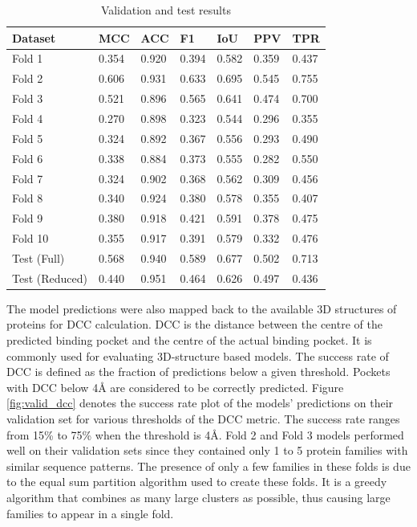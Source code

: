 \documentclass[journal=jcisd8,manuscript=article]{achemso}
\begin{document}
\begin{table}
    \centering
    \begin{tabular}{| P{2.9cm} | P{1.75cm} | P{1.75cm} | P{1.75cm} | P{1.75cm} | P{1.75cm} | P{1.75cm} |}
        \hline
        Dataset        & MCC   & ACC   & F1    & IoU   & PPV   & TPR   \\
        \hline
        Fold 1         & 0.354 & 0.920 & 0.394 & 0.582 & 0.359 & 0.437 \\
        Fold 2         & 0.606 & 0.931 & 0.633 & 0.695 & 0.545 & 0.755 \\
        Fold 3         & 0.521 & 0.896 & 0.565 & 0.641 & 0.474 & 0.700 \\
        Fold 4         & 0.270 & 0.898 & 0.323 & 0.544 & 0.296 & 0.355 \\
        Fold 5         & 0.324 & 0.892 & 0.367 & 0.556 & 0.293 & 0.490 \\
        Fold 6         & 0.338 & 0.884 & 0.373 & 0.555 & 0.282 & 0.550 \\
        Fold 7         & 0.324 & 0.902 & 0.368 & 0.562 & 0.309 & 0.456 \\
        Fold 8         & 0.340 & 0.924 & 0.380 & 0.578 & 0.355 & 0.407 \\
        Fold 9         & 0.380 & 0.918 & 0.421 & 0.591 & 0.378 & 0.475 \\
        Fold 10        & 0.355 & 0.917 & 0.391 & 0.579 & 0.332 & 0.476 \\
        Test (Full)    & 0.568 & 0.940 & 0.589 & 0.677 & 0.502 & 0.713 \\
        Test (Reduced) & 0.440 & 0.951 & 0.464 & 0.626 & 0.497 & 0.436 \\
        \hline
    \end{tabular}
    \caption{\label{tab:results} Validation and test results}
\end{table}

\newpage
The model predictions were also mapped back to the available 3D structures of proteins for DCC calculation. DCC is the distance between the centre of the predicted binding pocket and the centre of the actual binding pocket. It is commonly used for evaluating 3D-structure based models. The success rate of DCC is defined as the fraction of predictions below a given threshold. Pockets with DCC below 4{\AA} are considered to be correctly predicted. Figure \ref{fig:valid_dcc} denotes the success rate plot of the models' predictions on their validation set for various thresholds of the DCC metric. The success rate ranges from 15\% to 75\% when the threshold is 4{\AA}. Fold 2 and Fold 3 models performed well on their validation sets since they contained only 1 to 5 protein families with similar sequence patterns. The presence of only a few families in these folds is due to the equal sum partition algorithm used to create these folds. It is a greedy algorithm that combines as many large clusters as possible, thus causing large families to appear in a single fold.
\end{document}
